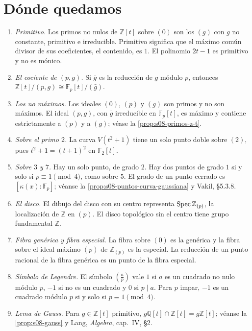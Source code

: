 \section{Dónde quedamos}

\begin{obs}[Fe de erratas de la 8d]
\label{obs:s09-erratas-ocho}
\begin{enumerate}
\item \emph{Primitivo.} Los primos no nulos de $\mathbb Z[t]$ sobre $(0)$ son los $(g)$ con $g$ no constante, primitivo e irreducible. Primitivo significa que el máximo común divisor de sus coeficientes, el contenido, es $1$. El polinomio $2t-1$ es primitivo y no es mónico.
\item \emph{El cociente de $(p,g)$.} Si $\bar g$ es la reducción de $g$ módulo $p$, entonces $\mathbb Z[t]/(p,g)\cong\mathbb F_p[t]/(\bar g)$.
\item \emph{Los no máximos.} Los ideales $(0)$, $(p)$ y $(g)$ son primos y no son máximos. El ideal $(p,g)$, con $\bar g$ irreducible en $\mathbb F_p[t]$, es máximo y contiene estrictamente a $(p)$ y a $(g)$; véase la \cref{prop:s08-primos-z-t}.
\item \emph{Sobre el primo $2$.} La curva $V(t^2+1)$ tiene un solo punto doble sobre $(2)$, pues $t^2+1=(t+1)^2$ en $\mathbb F_2[t]$.
\item \emph{Sobre $3$ y $7$.} Hay un solo punto, de grado $2$. Hay dos puntos de grado $1$ si y solo si $p\equiv1\pmod4$, como sobre $5$. El grado de un punto cerrado es $[\kappa(x):\mathbb F_p]$; véanse la \cref{prop:s08-puntos-curva-gaussiana} y Vakil, \S5.3.8.
\item \emph{El disco.} El dibujo del disco con su centro representa $\operatorname{Spec}\mathbb Z_{(p)}$, la localización de $\mathbb Z$ en $(p)$. El disco topológico sin el centro tiene grupo fundamental $\mathbb Z$.
\item \emph{Fibra genérica y fibra especial.} La fibra sobre $(0)$ es la genérica y la fibra sobre el ideal máximo $(p)$ de $\mathbb Z_{(p)}$ es la especial. La reducción de un punto racional de la fibra genérica es un punto de la fibra especial.
\item \emph{Símbolo de Legendre.} El símbolo $\left(\frac ap\right)$ vale $1$ si $a$ es un cuadrado no nulo módulo $p$, $-1$ si no es un cuadrado y $0$ si $p\mid a$. Para $p$ impar, $-1$ es un cuadrado módulo $p$ si y solo si $p\equiv1\pmod4$.
\item \emph{Lema de Gauss.} Para $g\in\mathbb Z[t]$ primitivo, $g\mathbb Q[t]\cap\mathbb Z[t]=g\mathbb Z[t]$; véanse la \cref{prop:s08-gauss} y Lang, \emph{Algebra}, cap.~IV, \S2.
\end{enumerate}
\end{obs}

